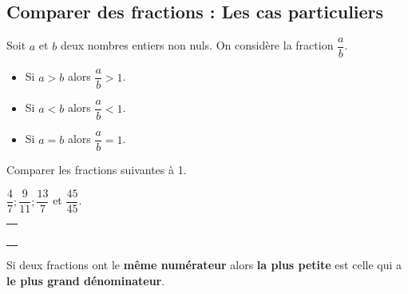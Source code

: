 \documentclass[a4paper]{book}
\begin{document}
\newpage


\subsection{Comparer des fractions : Les cas particuliers}

    \begin{propriete}
        Soit $a$ et $b$ deux nombres entiers non nuls. On considère la fraction $\dfrac{a}{b}$.
        \begin{itemize}
            \item Si $a>b$ alors $\dfrac{a}{b}>1$.
            \item Si $a<b$ alors $\dfrac{a}{b}<1$.
            \item Si $a=b$ alors $\dfrac{a}{b}=1$.
        \end{itemize}
    \end{propriete}


    \begin{exemple}
        Comparer les fractions suivantes à 1.

        $\dfrac{4}{7}; \dfrac{9}{11}; \dfrac{13}{7}$ et $\dfrac{45}{45}$.

        \medskip

        \begin{tabular}{|p{16cm}|}
            \hline \\ \\ \\ \\ \\ \hline            
        \end{tabular}
    \end{exemple}
    

    \begin{propriete}
        Si deux fractions ont le \textbf{même numérateur} alors \textbf{la plus petite} est celle qui a \textbf{le plus grand dénominateur}.
    \end{propriete}
\end{document}
